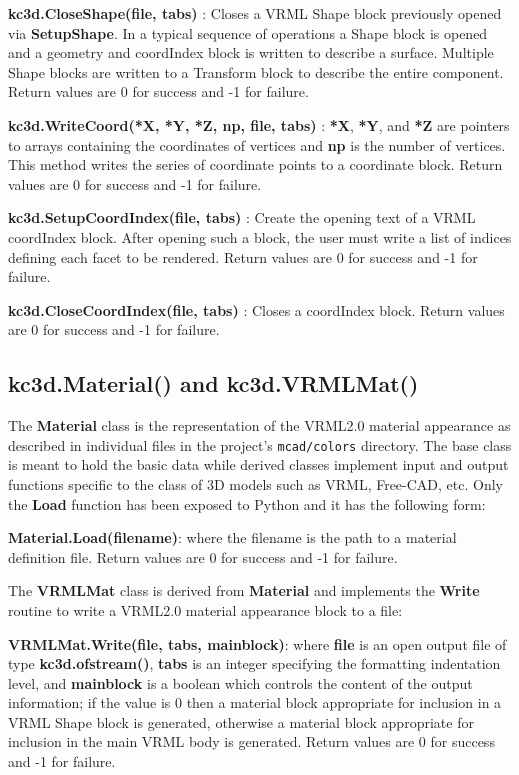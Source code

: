 \documentclass[a4paper, dvipdfm]{article}
\begin{document}
\textbf{kc3d.CloseShape(file, tabs)} : Closes a VRML Shape block previously
opened via \textbf{SetupShape}. In a typical sequence of operations
a Shape block is opened and a geometry and coordIndex block is written
to describe a surface. Multiple Shape blocks are written to a
Transform block to describe the entire component. Return values are
0 for success and -1 for failure.

\textbf{kc3d.WriteCoord(*X, *Y, *Z, np, file, tabs)} : \textbf{*X},
\textbf{*Y}, and \textbf{*Z} are pointers to arrays containing the
coordinates of vertices and \textbf{np} is the number of vertices.
This method writes the series of coordinate points to a
coordinate block. Return values are 0 for success and -1 for failure.

\textbf{kc3d.SetupCoordIndex(file, tabs)} : Create the opening text
of a VRML coordIndex block. After opening such a block, the user
must write a list of indices defining each facet to be rendered.
Return values are 0 for success and -1 for failure.

\textbf{kc3d.CloseCoordIndex(file, tabs)} : Closes a coordIndex
block. Return values are 0 for success and -1 for failure.

\subsection{kc3d.Material() and kc3d.VRMLMat()}
The \textbf{Material} class is the representation of the VRML2.0 material
appearance as described in individual files in the project's \verb#mcad/colors#
directory. The base class is meant to hold the basic data while derived classes
implement input and output functions specific to the class of 3D models such
as VRML, Free-CAD, etc. Only the \textbf{Load} function has been exposed to
Python and it has the following form:

\textbf{Material.Load(filename)}: where the filename is the path to a
material definition file. Return values are 0 for success and -1 for failure.

The \textbf{VRMLMat} class is derived from \textbf{Material} and implements
the \textbf{Write} routine to write a VRML2.0 material appearance block to
a file:

\textbf{VRMLMat.Write(file, tabs, mainblock)}: where \textbf{file} is an open
output file of type \textbf{kc3d.ofstream()}, \textbf{tabs} is an integer
specifying the formatting indentation level, and \textbf{mainblock} is a boolean
which controls the content of the output information; if the value is 0 then
a material block appropriate for inclusion in a VRML Shape block is generated,
otherwise a material block appropriate for inclusion in the main VRML body
is generated.  Return values are 0 for success and -1 for failure.
\end{document}
